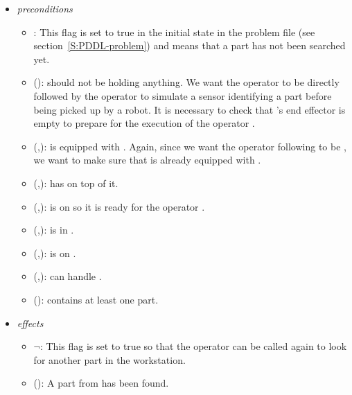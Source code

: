 \begin{enumerate}
\begin{itemize}
 \item \textit{preconditions}
 \begin{itemize}
 \item {}: This flag is set to true in the initial state in the problem file (see section~\ref{S:PDDL-problem}) and means that a part has not been searched yet.
 \item {}():  should not be holding anything. We want the operator  to be directly followed by the operator  to simulate a sensor identifying a part before being picked up by a robot. It is necessary to check that 's end effector is empty to prepare for the execution of the operator .
 \item {}(,):  is equipped with . Again, since we want the operator following  to be , we want to make sure that  is already equipped with .
 \item {}(,):  has  on top of it.
 \item {}(,):  is on  so it is ready for the operator .
 \item {}(,):  is in .
 \item {}(,):  is on .
 \item {}(,):  can handle .
 \item {}():  contains at least one part.
 \end{itemize}
\item \textit{effects}
 \begin{itemize}
 \item $\neg$: This flag is set to true so that the operator  can be called again to look for another part in the workstation.
 \item {}(): A part from  has been found.
 \end{itemize}
 \end{itemize}


\end{enumerate}
